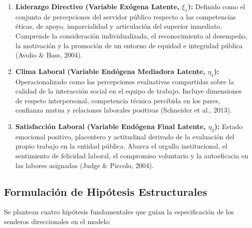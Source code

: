 \documentclass[11pt, a4paper]{article} %
\begin{document}
\begin{enumerate}[leftmargin=*, itemsep=2pt]
    \item \textbf{Liderazgo Directivo (Variable Exógena Latente, $\xi_1$):} Definido como el conjunto de percepciones del servidor público respecto a las competencias éticas, de apoyo, imparcialidad y articulación del superior inmediato. Comprende la consideración individualizada, el reconocimiento al desempeño, la motivación y la promoción de un entorno de equidad e integridad pública (Avolio \& Bass, 2004).
    \item \textbf{Clima Laboral (Variable Endógena Mediadora Latente, $\eta_1$):} Operacionalizado como las percepciones evaluativas compartidas sobre la calidad de la interacción social en el equipo de trabajo. Incluye dimensiones de respeto interpersonal, competencia técnica percibida en los pares, confianza mutua y relaciones laborales positivas (Schneider et al., 2013).
    \item \textbf{Satisfacción Laboral (Variable Endógena Final Latente, $\eta_2$):} Estado emocional positivo, placentero y actitudinal derivado de la evaluación del propio trabajo en la entidad pública. Abarca el orgullo institucional, el sentimiento de felicidad laboral, el compromiso voluntario y la autoeficacia en las labores asignadas (Judge \& Piccolo, 2004).
\end{enumerate}

\subsection{Formulación de Hipótesis Estructurales}

Se plantean cuatro hipótesis fundamentales que guían la especificación de los senderos direccionales en el modelo:
\end{document}
